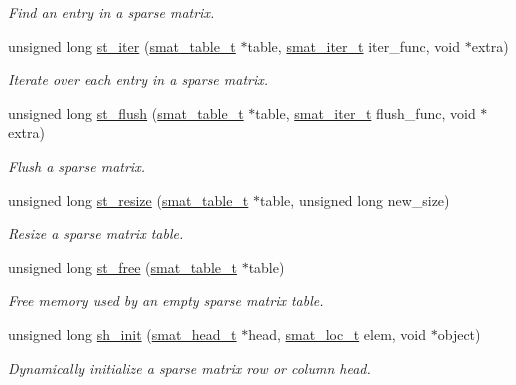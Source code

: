 \begin{CompactItemize}
\begin{CompactList}\small\item\em Find an entry in a sparse matrix.\item\end{CompactList}\item 
unsigned long \hyperlink{group__dbprim__smat_a13}{st\_\-iter} (\hyperlink{group__dbprim__smat_a0}{smat\_\-table\_\-t} $\ast$table, \hyperlink{group__dbprim__smat_a4}{smat\_\-iter\_\-t} iter\_\-func, void $\ast$extra)
\begin{CompactList}\small\item\em Iterate over each entry in a sparse matrix.\item\end{CompactList}\item 
unsigned long \hyperlink{group__dbprim__smat_a14}{st\_\-flush} (\hyperlink{group__dbprim__smat_a0}{smat\_\-table\_\-t} $\ast$table, \hyperlink{group__dbprim__smat_a4}{smat\_\-iter\_\-t} flush\_\-func, void $\ast$extra)
\begin{CompactList}\small\item\em Flush a sparse matrix.\item\end{CompactList}\item 
unsigned long \hyperlink{group__dbprim__smat_a15}{st\_\-resize} (\hyperlink{group__dbprim__smat_a0}{smat\_\-table\_\-t} $\ast$table, unsigned long new\_\-size)
\begin{CompactList}\small\item\em Resize a sparse matrix table.\item\end{CompactList}\item 
unsigned long \hyperlink{group__dbprim__smat_a16}{st\_\-free} (\hyperlink{group__dbprim__smat_a0}{smat\_\-table\_\-t} $\ast$table)
\begin{CompactList}\small\item\em Free memory used by an empty sparse matrix table.\item\end{CompactList}\item 
unsigned long \hyperlink{group__dbprim__smat_a17}{sh\_\-init} (\hyperlink{group__dbprim__smat_a1}{smat\_\-head\_\-t} $\ast$head, \hyperlink{group__dbprim__smat_a6}{smat\_\-loc\_\-t} elem, void $\ast$object)
\begin{CompactList}\small\item\em Dynamically initialize a sparse matrix row or column head.\item\end{CompactList}\item 

\end{CompactItemize}

